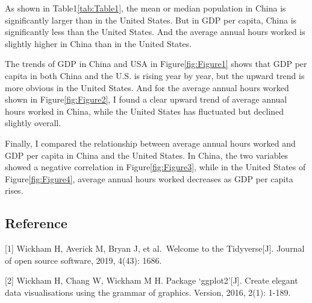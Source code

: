 \documentclass[11pt,a4paper,]{article}
\begin{document}
As shown in Table1\ref{tab:Table1}, the mean or median population in China is significantly larger than in the United States. But in GDP per capita, China is significantly less than the United States. And the average annual hours worked is slightly higher in China than in the United States.

The trends of GDP in China and USA in Figure\ref{fig:Figure1} shows that GDP per capita in both China and the U.S. is rising year by year, but the upward trend is more obvious in the United States. And for the average annual hours worked shown in Figure\ref{fig:Figure2}, I found a clear upward trend of average annual hours worked in China, while the United States has fluctuated but declined slightly overall.

Finally, I compared the relationship between average annual hours worked and GDP per capita in China and the United States. In China, the two variables showed a negative correlation in Figure\ref{fig:Figure3}, while in the United States of Figure\ref{fig:Figure4}, average annual hours worked decreases as GDP per capita rises.

\hypertarget{reference}{%
\subsection{Reference}\label{reference}}

{[}1{]} Wickham H, Averick M, Bryan J, et al.~Welcome to the Tidyverse{[}J{]}. Journal of open source software, 2019, 4(43): 1686.

{[}2{]} Wickham H, Chang W, Wickham M H. Package `ggplot2'{[}J{]}. Create elegant data visualisations using the grammar of graphics. Version, 2016, 2(1): 1-189.

\printbibliography
\end{document}
